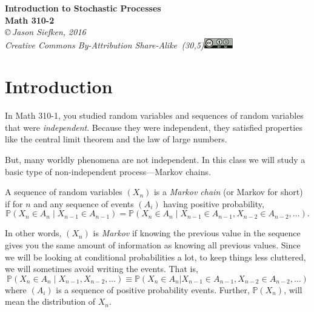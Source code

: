\documentclass{problemset}
\newcommand{\1}{\mathbf{1}}
\renewcommand{\P}{\mathbb{P}}
\begin{document}
\pagestyle{fancy}
\renewcommand{\headrulewidth}{0pt}

\begin{center}
	{\huge\bf Introduction to Stochastic Processes \\{\sc Math 310-2}}\\

\vspace{.7in}
{
\it \copyright\,Jason Siefken, 2016 \\
Creative Commons By-Attribution Share-Alike\, \makebox(30,5){\includegraphics[height=1.2em]{by-sa.pdf}}
}
\end{center}

\section*{Introduction}


	In Math 310-1, you studied random variables and sequences of random variables that
	were \emph{independent}.  Because they were independent, they satisfied properties like 
	the central limit theorem and the law of large numbers.

	But, many worldly phenomena are not independent.  In this class
	we will study a basic type of non-independent process---Markov chains.

	\begin{definition}
		A sequence of random variables $(X_n)$ is a \emph{Markov chain} (or
		Markov for short) if for $n$ and any sequence of events $(A_i)$ having positive
		probability,
		\[
			\P(X_n\in A_n \mid X_{n-1}\in A_{n-1}) = \P(X_n\in A_n\mid X_{n-1}\in A_{n-1},X_{n-2}\in A_{n-2},\ldots).
		\]
	\end{definition}

	In other words, $(X_n)$ is \emph{Markov} if knowing the previous value in the sequence
	gives you the same amount of information as knowing all previous values.  Since we will be looking
	at conditional probabilities a lot, to keep things less cluttered, we will sometimes
	avoid writing the events.  That is,
	\[
		\P(X_n\in A_n\mid X_{n-1}, X_{n-2},\ldots) \equiv \P(X_n\in A_n| X_{n-1}\in A_{n-1}, X_{n-2}\in A_{n-2},\ldots)
	\]
	where $(A_i)$ is a sequence of positive probability events.  Further, $\P(X_n)$, will mean the distribution of $X_n$.
\end{document}
